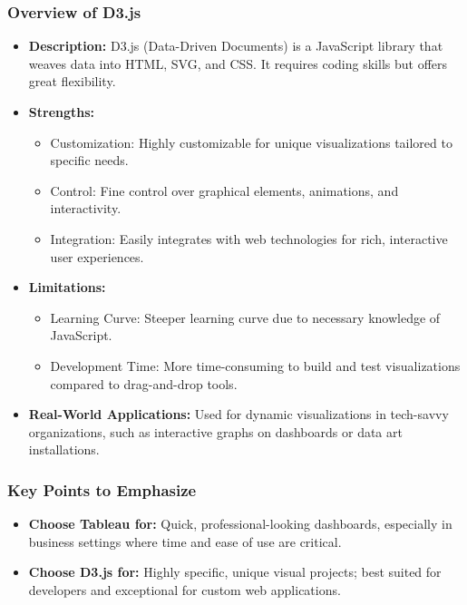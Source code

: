 \documentclass{beamer}
\begin{document}
\begin{frame}[fragile]
    \frametitle{Overview of D3.js}
    \begin{itemize}
        \item \textbf{Description:} D3.js (Data-Driven Documents) is a JavaScript library that weaves data into HTML, SVG, and CSS. It requires coding skills but offers great flexibility.
        
        \item \textbf{Strengths:}
        \begin{itemize}
            \item Customization: Highly customizable for unique visualizations tailored to specific needs.
            \item Control: Fine control over graphical elements, animations, and interactivity.
            \item Integration: Easily integrates with web technologies for rich, interactive user experiences.
        \end{itemize}
        
        \item \textbf{Limitations:}
        \begin{itemize}
            \item Learning Curve: Steeper learning curve due to necessary knowledge of JavaScript.
            \item Development Time: More time-consuming to build and test visualizations compared to drag-and-drop tools.
        \end{itemize}
        
        \item \textbf{Real-World Applications:} Used for dynamic visualizations in tech-savvy organizations, such as interactive graphs on dashboards or data art installations.
    \end{itemize}
\end{frame}

\begin{frame}[fragile]
    \frametitle{Key Points to Emphasize}
    \begin{itemize}
        \item \textbf{Choose Tableau for:} Quick, professional-looking dashboards, especially in business settings where time and ease of use are critical.
        
        \item \textbf{Choose D3.js for:} Highly specific, unique visual projects; best suited for developers and exceptional for custom web applications.
    \end{itemize}
\end{frame}
\end{document}
